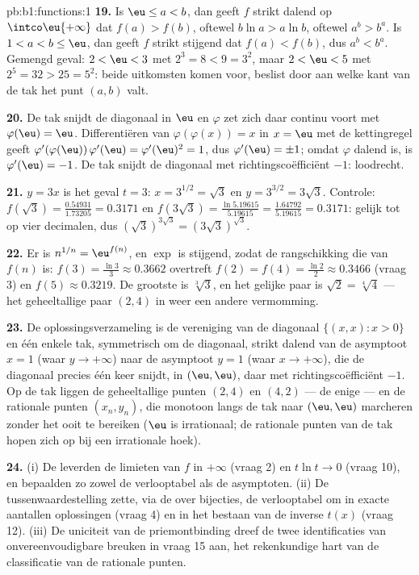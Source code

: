 \begin{solution}{pb:b1:functions:1}
\textbf{19.} Is $\eu \leq a < b$, dan geeft $f$ strikt dalend op
$\intco\eu{+\infty}$ dat $f(a) > f(b)$, oftewel $b\ln a > a\ln b$,
oftewel $a^b > b^a$. Is $1 < a < b \leq \eu$, dan geeft $f$ strikt
stijgend dat $f(a) < f(b)$, dus $a^b < b^a$. Gemengd geval: $2 < \eu <
3$ met $2^3 = 8 < 9 = 3^2$, maar $2 < \eu < 5$ met $2^5 = 32 > 25 =
5^2$: beide uitkomsten komen voor, beslist door aan welke kant van de tak
het punt $(a, b)$ valt.

\textbf{20.} De tak snijdt de diagonaal in $\eu$ en $\varphi$ zet zich
daar continu voort met $\varphi(\eu) = \eu$. Differentiëren van
$\varphi(\varphi(x)) = x$ in $x = \eu$ met de kettingregel geeft
$\varphi'(\varphi(\eu))\,\varphi'(\eu) = \varphi'(\eu)^2 = 1$, dus
$\varphi'(\eu) = \pm1$; omdat $\varphi$ dalend is, is $\varphi'(\eu) =
-1$. De tak snijdt de diagonaal met richtingscoëfficiënt $-1$: loodrecht.

\textbf{21.} $y = 3x$ is het geval $t = 3$: $x = 3^{1/2} = \sqrt3$ en $y
= 3^{3/2} = 3\sqrt3$. Controle: $f(\sqrt3) = \frac{0.54931}{1.73205} =
0.3171$ en $f(3\sqrt3) = \frac{\ln 5.19615}{5.19615} =
\frac{1.64792}{5.19615} = 0.3171$: gelijk tot op vier decimalen, dus
$(\sqrt3)^{3\sqrt3} = (3\sqrt3)^{\sqrt3}$.

\textbf{22.} Er is $n^{1/n} = \eu^{f(n)}$, en $\exp$ is stijgend, zodat
de rangschikking die van $f(n)$ is: $f(3) = \frac{\ln3}3 \approx 0.3662$
overtreft $f(2) = f(4) = \frac{\ln2}2 \approx 0.3466$ (vraag 3) en $f(5)
\approx 0.3219$. De grootste is $\sqrt[3]3$, en het gelijke paar is
$\sqrt2 = \sqrt[4]4$ --- het geheeltallige paar $(2, 4)$ in weer een
andere vermomming.

\textbf{23.} De oplossingsverzameling is de vereniging van de diagonaal
$\{(x, x) : x > 0\}$ en één enkele tak, symmetrisch om de diagonaal,
strikt dalend van de asymptoot $x = 1$ (waar $y \to +\infty$) naar de
asymptoot $y = 1$ (waar $x \to +\infty$), die de diagonaal precies één
keer snijdt, in $(\eu, \eu)$, daar met richtingscoëfficiënt $-1$. Op de
tak liggen de geheeltallige punten $(2, 4)$ en $(4, 2)$ --- de enige ---
en de rationale punten $(x_n, y_n)$, die monotoon langs de tak naar
$(\eu, \eu)$ marcheren zonder het ooit te bereiken ($\eu$ is
irrationaal; de rationale punten van de tak hopen zich op bij een
irrationale hoek).

\textbf{24.} (i) De  leverden de limieten van $f$ in
$+\infty$ (vraag 2) en $t\ln t \to 0$ (vraag 10), en bepaalden zo zowel
de verlooptabel als de asymptoten. (ii) De tussenwaardestelling zette,
via de  over bijecties, de verlooptabel om in exacte
aantallen oplossingen (vraag 4) en in het bestaan van de inverse
 $t(x)$ (vraag 12). (iii) De uniciteit van de priemontbinding
dreef de twee identificaties van onvereenvoudigbare breuken in vraag 15
aan, het rekenkundige hart van de classificatie van de rationale punten.


\end{solution}
